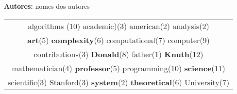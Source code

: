 \documentclass[12pt,a4paper]{article}
\begin{document}
\begin{center}
{\bf Autores:} {\sc nomes dos autores} \\
\vspace*{0.3cm}


\end{center}


\begin{center}
\begin{tabular}{|c|}
\hline 
{\Huge {algorithms}} \footnotesize{(10)} {\normalsize{academic)}}\footnotesize{(3)} {\small{american}}\footnotesize{(2)} {\footnotesize{analysis}}\footnotesize{(2)} \\
\textbf{\large{art}}\footnotesize{(5)} \textbf{\Large{complexity}}\footnotesize{(6)} {\Large{computational}}\footnotesize{(7)} {\Huge{computer}}\footnotesize{(9)}  \\
{\small{contributions}}\footnotesize{(3)} \textbf{\Huge{Donald}}\footnotesize{(8)} \footnotesize{father}\footnotesize{(1)} {\textbf{\Huge{Knuth}}}\footnotesize{(12)}\\ {\normalsize{mathematician}}\footnotesize{(4)}  {\textbf{\small{professor}}}\footnotesize{(5)} {\Huge{programming}}\footnotesize{(10)} {\textbf{\huge{science}}}\footnotesize{(11)} \\
{ \small{scientific}}\footnotesize{(3)} {\normalsize{Stanford}}\footnotesize{(3)} {\textbf{\small{system}}}\footnotesize{(2)} \textbf{\large{theoretical}}\footnotesize{(6)} {\Large{University}}\footnotesize{(7)}\\
 


 \hline
 \end{tabular}
\end{center}
\end{document}
